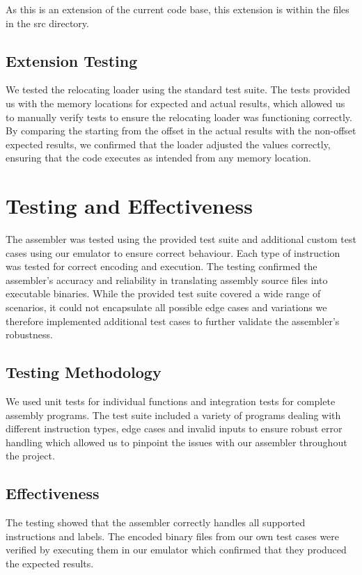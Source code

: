 \documentclass[a4paper, 10pt]{article}
\begin{document}
As this is an extension of the current code base, this extension is within the files in the src directory.
\subsection{Extension Testing}

We tested the relocating loader using the standard test suite. The tests provided us with the memory locations for expected and actual results, which allowed us to manually verify tests to ensure the relocating loader was functioning correctly. By comparing the starting from the offset in the actual results with the non-offset expected results, we confirmed that the loader adjusted the values correctly, ensuring that the code executes as intended from any memory location.

\section{Testing and Effectiveness}
The assembler was tested using the provided test suite and additional custom test cases using our emulator to ensure correct behaviour. Each type of instruction was tested for correct encoding and execution. The testing confirmed the assembler's accuracy and reliability in translating assembly source files into executable binaries. While the provided test suite covered a wide range of scenarios, it could not encapsulate all possible edge cases and variations we therefore implemented additional test cases to further validate the assembler's robustness.

\subsection{Testing Methodology}
We used unit tests for individual functions and integration tests for complete assembly programs. The test suite included a variety of programs dealing with different instruction types, edge cases and invalid inputs to ensure robust error handling which allowed us to pinpoint the issues with our assembler throughout the project.

\subsection{Effectiveness}
The testing showed that the assembler correctly handles all supported instructions and labels. The encoded binary files from our own test cases were verified by executing them in our emulator which confirmed that they produced the expected results.
\newline
\end{document}
